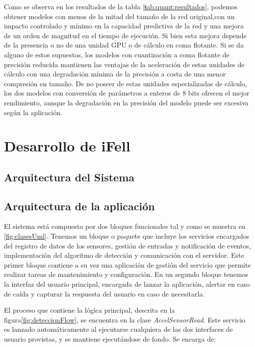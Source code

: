 Como se observa en los resultados de la tabla \ref{ŧab:quant:resultados}, podemos obtener modelos con menos de la mitad del tamaño de la red original,con un impacto controlado y mínimo en la capacidad predictiva de la red y una mejora de un orden de magnitud en el tiempo de ejecución. Si bien esta mejora depende de la presencia o no de una unidad GPU o de cálculo en coma flotante. Si se da alguno de estos supuestos, los modelos con cuantización a coma flotante de precisión reducida mantienen las ventajas de la aceleración de estas unidades de cálculo con una degradación mínima de la precisión a costa de una menor compresión en tamaño. De no poseer de estas unidades especializadas de cálculo, los dos modelos con conversión de parámetros a enteros de 8 bits ofrecen el mejor rendimiento, aunque la degradación en la precisión del modelo puede ser excesiva según la aplicación. 

\section{Desarrollo de iFell}

\subsection{Arquitectura del Sistema}

\subsection{Arquitectura de la aplicación}

El sistema está compuesto por dos bloques funcionales tal y como se muestra en \ref{fig:clasesUml}. Tenemos un bloque o paquete que incluye los servicios encargados del registro de datos de los sensores, gestión de entradas y notificación de eventos, implementación del algoritmo de detección y comunicación con el servidor. Este primer bloque contiene a su vez una aplicación de gestión del servicio que permite realizar tareas de mantenimiento y configuración. En un segundo bloque tenemos la interfaz del usuario principal, encargada de lanzar la aplicación, alertar en caso de caída y capturar la respuesta del usuario en caso de necesitarla.


El proceso que contiene la lógica principal, descrita en la figura\ref{fig:deteccionFlow}, se encuentra en la clase \textit{AccelSensorRead}. Este servicio es lanzado automáticamente al ejecutarse cualquiera de las dos interfaces de usuario provistas, y se mantiene ejecutándose de fondo. Se encarga de:

